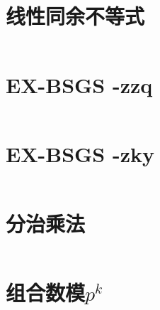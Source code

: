 \section{线性同余不等式}
\inputminted{cpp}{\source/number-theory/线性同余不等式.cpp}
\section{EX-BSGS -zzq}
\inputminted{cpp}{\source/number-theory/EX-BSGS-zzq.cpp}
\section{EX-BSGS -zky}
\inputminted{cpp}{\source/number-theory/EX-BSGS-zky.cpp}
\section{分治乘法}
\inputminted{cpp}{\source/number-theory/DAC-multiply}
\section{组合数模$p^k$}
\inputminted{cpp}{\source/number-theory/CnmmodP.cpp}
